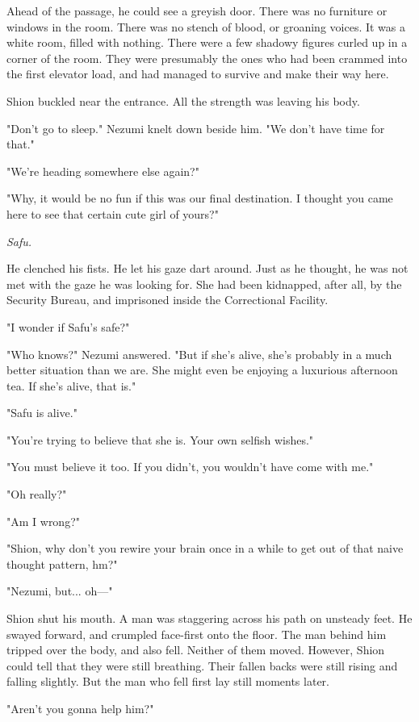 Ahead of the passage, he could see a greyish door. There was no
furniture or windows in the room. There was no stench of blood, or
groaning voices. It was a white room, filled with nothing. There were a
few shadowy figures curled up in a corner of the room. They were
presumably the ones who had been crammed into the first elevator load,
and had managed to survive and make their way here.

Shion buckled near the entrance. All the strength was leaving his body.

"Don't go to sleep." Nezumi knelt down beside him. "We don't have time
for that."

"We're heading somewhere else again?"

"Why, it would be no fun if this was our final destination. I thought
you came here to see that certain cute girl of yours?"

\emph{Safu.}

He clenched his fists. He let his gaze dart around. Just as he thought,
he was not met with the gaze he was looking for. She had been kidnapped,
after all, by the Security Bureau, and imprisoned inside the
Correctional Facility.

"I wonder if Safu's safe?"

"Who knows?" Nezumi answered. "But if she's alive, she's probably in a
much better situation than we are. She might even be enjoying a
luxurious afternoon tea. If she's alive, that is."

"Safu is alive."

"You're trying to believe that she is. Your own selfish wishes."

"You must believe it too. If you didn't, you wouldn't have come with
me."

"Oh really?"

"Am I wrong?"

"Shion, why don't you rewire your brain once in a while to get out of
that naive thought pattern, hm?"

"Nezumi, but... oh---"

Shion shut his mouth. A man was staggering across his path on unsteady
feet. He swayed forward, and crumpled face-first onto the floor. The man
behind him tripped over the body, and also fell. Neither of them moved.
However, Shion could tell that they were still breathing. Their fallen
backs were still rising and falling slightly. But the man who fell first
lay still moments later.

"Aren't you gonna help him?"

